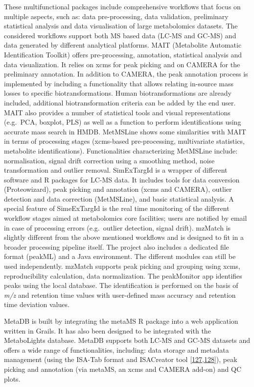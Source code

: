 \documentclass[]{article}
\begin{document}
These multifunctional packages include comprehensive workflows that focus on multiple aspects, such as: data pre-processing, data validation, preliminary statistical analysis and data visualisation of large metabolomics datasets. The considered workflows support both MS based data (LC-MS and GC-MS) and data generated by different analytical platforms. MAIT (Metabolite Automatic Identification Toolkit) offers pre-processing, annotation, statistical analysis and data visualization. It relies on xcms for peak picking and on CAMERA for the preliminary annotation. In addition to CAMERA, the peak annotation process is implemented by including a functionality that allows relating in-source mass losses to specific biotransformations. Human biotransformations are already included, additional biotransformation criteria can be added by the end user. MAIT also provides a number of statistical tools and visual representations (e.g.~PCA, boxplot, PLS) as well as a function to perform identifications using accurate mass search in HMDB. MetMSLine shows some similarities with MAIT in terms of processing stages (xcms-based pre-processing, multivariate statistics, metabolite identifications). Functionalities characterizing MetMSLine include: normalisation, signal drift correction using a smoothing method, noise transformation and outlier removal. SimExTargId is a wrapper of different software and R packages for LC-MS data. It includes tools for data conversion (Proteowizard), peak picking and annotation (xcms and CAMERA), outlier detection and data correction (MetMSLine), and basic statistical analysis. A special feature of SimeExTargId is the real time monitoring of the different workflow stages aimed at metabolomics core facilities; users are notified by email in case of processing errors (e.g.~outlier detection, signal drift). mzMatch is slightly different from the above mentioned workflows and is designed to fit in a broader processing pipeline itself. The project also includes a dedicated file format (peakML) and a Java environment. The different modules can still be used independently. mzMatch supports peak picking and grouping using xcms, reproducibility calculation, data normalization. The peakMonitor app identifies peaks using the local database. The identification is performed on the basis of \emph{m/z} and retention time values with user-defined mass accuracy and retention time deviation values.

MetaDB is built by integrating the metaMS R package into a web application written in Grails. It has also been designed to be integrated with the MetaboLights database. MetaDB supports both LC-MS and GC-MS datasets and offers a wide range of functionalities, including: data storage and metadata management (using the ISA-Tab format and ISACreator tool {[}\protect\hyperlink{ref-roccaserra_2010}{127},\protect\hyperlink{ref-sansone_2012}{128}{]}), peak picking and annotation (via metaMS, an xcms and CAMERA add-on) and QC plots.
\end{document}
